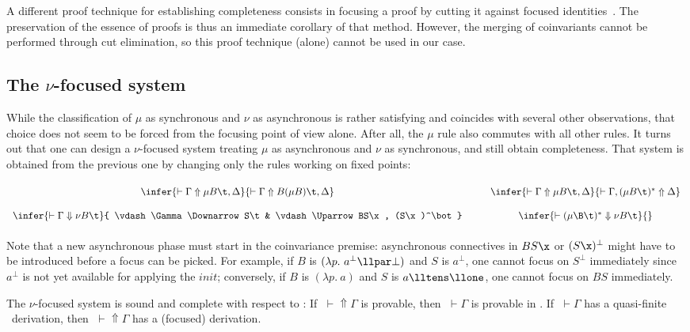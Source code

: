 A different proof technique for establishing completeness
consists in focusing a proof by cutting it against focused 
identities~\cite{laurent04unp,chaudhuri08jar}.
The preservation of the essence of proofs is thus an immediate
corollary of that method.
However, the merging of coinvariants cannot be performed through
cut elimination, so this proof technique (alone) cannot be used
in our case.



\subsection{The $\nu$-focused system}
\label{sec:nufoc}

While the classification of $\mu$ as synchronous and $\nu$ as
asynchronous is rather satisfying and coincides with several other observations,
that choice does not seem to be forced from the focusing point of view alone.
After all, the $\mu$ rule also commutes with all other rules.
It turns out that one can design a $\nu$-focused system
treating $\mu$ as asynchronous and $\nu$ as synchronous,
and still obtain completeness.
That system is obtained from the previous one by changing only
the rules working on fixed points:
\[ \renewcommand\arraystretch{2}\begin{array}{cp{0.3cm}c}
\infer{\vdash\Gamma\Uparrow\mu{}B\t,\Delta}{
       \vdash\Gamma\Uparrow B(\mu{}B)\t,\Delta}
& &
\infer{\vdash\Gamma\Uparrow\mu{}B\t,\Delta}{
   \vdash\Gamma,(\mu{}B\t)^*\Uparrow\Delta}
\\
\infer{\vdash\Gamma\Downarrow\nu{}B\t}{
       \vdash\Gamma\Downarrow S\t & \vdash\Uparrow BS\x, (S\x)^\bot}
& &
\infer{\vdash(\mu\B\t)^*\Downarrow\nu{}B\t}{}
\end{array} \]

Note that a new asynchronous phase must start in the coinvariance premise:
asynchronous connectives in $BS\x$ or $(S\x)^\perp$ might have to be
introduced before a focus can be picked.
For example, if $B$ is $(\lambda p.~ a^\perp \llpar \bot)$ and
$S$ is $a^\perp$, one cannot focus on $S^\perp$ immediately
since $a^\perp$ is not yet available for applying the $init$;
conversely, if $B$ is $(\lambda p.~ a)$ and $S$ is
$a\lltens\llone$, one cannot focus on $BS$ immediately.

\begin{theorem}
The $\nu$-focused system is sound and complete with respect to \mumall:
If $\;\vdash\Uparrow\Gamma$ is provable, then $\;\vdash\Gamma$
  is provable in \mumall.
If $\;\vdash\Gamma$ has a quasi-finite \mumall\ derivation,
  then $\;\vdash\Uparrow\Gamma$ has a (focused) derivation.
\end{theorem}

